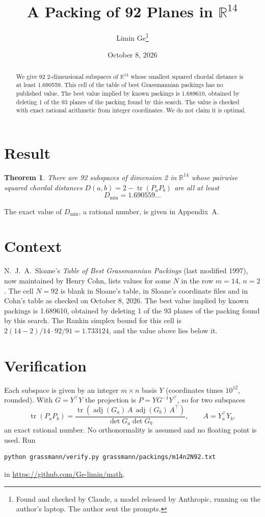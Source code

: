 \documentclass[11pt,a4paper]{article}
\title{A Packing of 92 Planes in $\mathbb{R}^{14}$}
\author{Limin Ge\thanks{Found and checked by Claude, a model released by Anthropic, running on the author's laptop. The author sent the prompts.}}
\date{October 8, 2026}
\newtheorem*{theorem}{Theorem}
\begin{document}
\maketitle
\begin{abstract}
We give 92 2-dimensional subspaces of $\mathbb{R}^{14}$ whose smallest squared chordal distance is at least 1.690559. This cell of the table of best Grassmannian packings has no published value. The best value implied by known packings is 1.689610, obtained by deleting 1 of the 93 planes of the packing found by this search. The value is checked with exact rational arithmetic from integer coordinates. We do not claim it is optimal.
\end{abstract}

\section{Result}
\begin{theorem}
There are 92 subspaces of dimension 2 in $\mathbb{R}^{14}$ whose pairwise squared chordal distances $D(a,b) = 2 - \operatorname{tr}(P_aP_b)$ are all at least
\[ D_{\min} = 1.690559\ldots \]
\end{theorem}
The exact value of $D_{\min}$, a rational number, is given in Appendix~A.


\section{Context}
N.~J.~A.~Sloane's \emph{Table of Best Grassmannian Packings} (last modified 1997), now maintained by Henry Cohn, lists values for some $N$ in the row $m=14$, $n=2$. The cell $N=92$ is blank in Sloane's table, in Sloane's coordinate files and in Cohn's table as checked on October 8, 2026. The best value implied by known packings is 1.689610, obtained by deleting 1 of the 93 planes of the packing found by this search. The Rankin simplex bound for this cell is $2(14-2)/14\cdot 92/91 = 1.733124$, and the value above lies below it.


\section{Verification}
Each subspace is given by an integer $m\times n$ basis $Y$ (coordinates times $10^{12}$, rounded). With $G=Y^\top Y$ the projection is $P=YG^{-1}Y^\top$, so for two subspaces
\[ \operatorname{tr}(P_aP_b)=\frac{\operatorname{tr}(\operatorname{adj}(G_a)\,A\,\operatorname{adj}(G_b)\,A^\top)}{\det G_a\det G_b},\qquad A=Y_a^\top Y_b, \]
an exact rational number. No orthonormality is assumed and no floating point is used. Run
\begin{verbatim}
python grassmann/verify.py grassmann/packings/m14n2N92.txt
\end{verbatim}
in \url{https://github.com/Ge-limin/math}.
\end{document}
